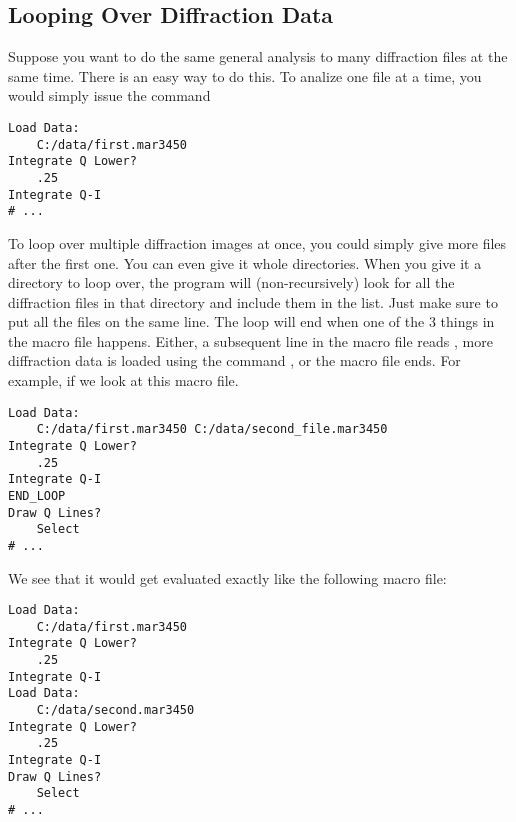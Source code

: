 \subsection{Looping Over Diffraction Data}
Suppose you want to do the same general analysis to many diffraction files at the same time. There is an easy way to do this. To analize one file at a time, you would simply issue the command
\begin{lstlisting}[caption={'Load the Diffraction Data'}]
Load Data:
    C:/data/first.mar3450
Integrate Q Lower?
    .25
Integrate Q-I
# ...
\end{lstlisting}
To loop over multiple diffraction images at once, you could simply give more files after the first one. You can even give it whole directories. When you give it a directory to loop over, the program will (non-recursively) look for all the diffraction files in that directory and include them in the list. Just make sure to put all the files on the same line. The loop will end when one of the 3 things in the macro file happens. Either, a subsequent line in the macro file reads , more diffraction data is loaded using the command , or the macro file ends. For example, if we look at this macro file.
\begin{lstlisting}[caption={'Loop Over Diffraction Data'}]
Load Data:
    C:/data/first.mar3450 C:/data/second_file.mar3450 
Integrate Q Lower?
    .25
Integrate Q-I
END_LOOP
Draw Q Lines?
    Select
# ...
\end{lstlisting}
We see that it would get evaluated exactly like the following macro file:
\begin{lstlisting}[caption={'An Equivalent Macro'}]
Load Data:
    C:/data/first.mar3450 
Integrate Q Lower?
    .25
Integrate Q-I
Load Data:
    C:/data/second.mar3450 
Integrate Q Lower?
    .25
Integrate Q-I
Draw Q Lines?
    Select
# ...
\end{lstlisting}

